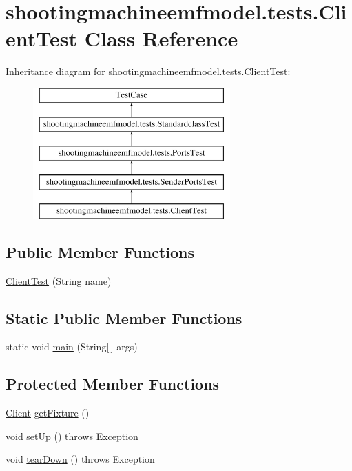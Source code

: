 \hypertarget{classshootingmachineemfmodel_1_1tests_1_1_client_test}{\section{shootingmachineemfmodel.\-tests.\-Client\-Test Class Reference}
\label{classshootingmachineemfmodel_1_1tests_1_1_client_test}
}
Inheritance diagram for shootingmachineemfmodel.\-tests.\-Client\-Test\-:\begin{figure}[H]
\begin{center}
\leavevmode
\includegraphics[height=5.000000cm]{classshootingmachineemfmodel_1_1tests_1_1_client_test}
\end{center}
\end{figure}
\subsection*{Public Member Functions}
\begin{DoxyCompactItemize}
\item 
\hyperlink{classshootingmachineemfmodel_1_1tests_1_1_client_test_a323233b1327f464305363a4598c60601}{Client\-Test} (String name)
\end{DoxyCompactItemize}
\subsection*{Static Public Member Functions}
\begin{DoxyCompactItemize}
\item 
static void \hyperlink{classshootingmachineemfmodel_1_1tests_1_1_client_test_a17496039c42a9dedd7ceb48fdf5c1ea1}{main} (String\mbox{[}$\,$\mbox{]} args)
\end{DoxyCompactItemize}
\subsection*{Protected Member Functions}
\begin{DoxyCompactItemize}
\item 
\hyperlink{interfaceshootingmachineemfmodel_1_1_client}{Client} \hyperlink{classshootingmachineemfmodel_1_1tests_1_1_client_test_ad4085477e31dfd2425c6debeca00fae2}{get\-Fixture} ()
\item 
void \hyperlink{classshootingmachineemfmodel_1_1tests_1_1_client_test_a267964412180851e1c632b1df024146d}{set\-Up} ()  throws Exception 
\item 
void \hyperlink{classshootingmachineemfmodel_1_1tests_1_1_client_test_a52d74d3026dc0670bf24388326ca8822}{tear\-Down} ()  throws Exception 
\end{DoxyCompactItemize}
